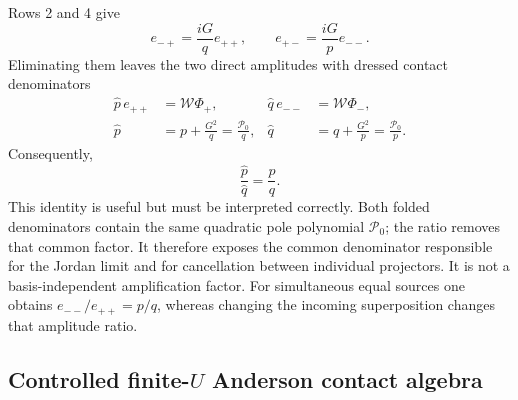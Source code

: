 \documentclass[%
  aps,prb,reprint,amsmath,amssymb,superscriptaddress,longbibliography,floatfix
]{revtex4-2}
\begin{document}
Rows 2 and 4 give
\begin{equation}
e_{-+}=\frac{iG}{q}e_{++},\qquad
e_{+-}=\frac{iG}{p}e_{--}.
\label{eq:cross_contact_elimination}
\end{equation}
Eliminating them leaves the two direct amplitudes with dressed contact
denominators
\begin{align}
\widehat p\,e_{++}&=\mathcal W\Phi_+,&
\widehat q\,e_{--}&=\mathcal W\Phi_-,
\nonumber\\
\widehat p&=p+\frac{G^2}{q}=\frac{\mathcal P_0}{q},&
\widehat q&=q+\frac{G^2}{p}=\frac{\mathcal P_0}{p}.
\label{eq:folded_contact_denominators}
\end{align}
Consequently,
\begin{equation}
\frac{\widehat p}{\widehat q}=\frac{p}{q}.
\label{eq:contact_ratio_identity}
\end{equation}
This identity is useful but must be interpreted correctly.  Both folded
denominators contain the same quadratic pole polynomial $\mathcal P_0$;
the ratio removes that common factor.  It therefore exposes the common
denominator responsible for the Jordan limit and for cancellation between
individual projectors.  It is not a basis-independent amplification factor.
For simultaneous equal sources one obtains
$e_{--}/e_{++}=p/q$, whereas changing the incoming superposition changes
that amplitude ratio.

\subsection{Controlled finite-\texorpdfstring{$U$}{U} Anderson contact
algebra}
\label{app:integrable_reduction}
\end{document}
